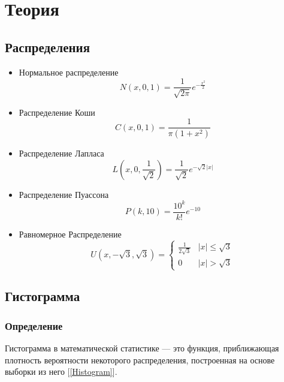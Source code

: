 \documentclass[12pt,a4paper]{article}
\begin{document}
\section{Теория}
	\subsection{Распределения}
	\begin{itemize}
		\item Нормальное распределение \begin{equation}\label{eqn:normal}
		N(x,0,1) = \frac{1}{\sqrt{2\pi}}e^{-\frac{x^2}{2}}
		\end{equation}
		
		\item Распределение Коши
		\begin{equation}\label{eqn:cauchy}
		C(x,0,1) = \frac{1}{\pi(1+x^2)}
		\end{equation}
		
		\item Распределение Лапласа
		\begin{equation}\label{eqn:laplace}
		L\left( x,0,\frac{1}{\sqrt{2}}\right) = \frac{1}{\sqrt{2}}e^{-\sqrt{2}\vert x\vert}
		\end{equation}
		
		\item Распределение Пуассона
		\begin{equation}\label{eqn:poisson}
		P(k,10) = \frac{10^k}{k!}e^{-10}
		\end{equation}
		
		\item Равномерное Распределение
		\begin{equation}\label{eqn:uniform}
		U(x,-\sqrt{3}, \sqrt{3}) = 
		\begin{cases}
		\frac{1}{2\sqrt{3}} &\vert x\vert \leqslant \sqrt{3}\\
		0 &\vert x\vert > \sqrt{3}
		\end{cases}
		\end{equation}
	\end{itemize}

	\subsection{Гистограмма}
		\subsubsection{Определение}
			Гистограмма в математической статистике --- это функция, приближающая
			плотность вероятности некоторого распределения, построенная на основе
			выборки из него [\ref{Histogram}].
\end{document}
